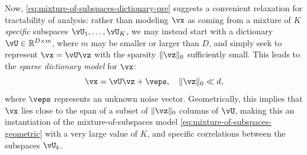 \documentclass[../../book-main.tex]{subfiles}
\begin{document}
Now, \eqref{eq:mixture-of-subspaces-dictionary-pre} suggests a convenient relaxation for tractability of analysis: rather than modeling $\vx$ as coming from a mixture of $K$ \textit{specific} subspaces $\vU_1, \dots, \vU_K$, we may instead start with a dictionary $\vU \in \R^{D \times m}$, where $m$ may be smaller or larger than $D$, and simply seek to represent $\vx = \vU \vz$ with the sparsity $\norm{\vz}_0$ sufficiently small.
This leads to the \textit{sparse dictionary model} for $\vx$:
\begin{equation}\label{eq:mixture-of-subspaces-dictionary}
    \vx =  \vU \vz + \veps,
    \quad
    \norm{\vz}_0 \ll d,
\end{equation}
where $\veps$ represents an unknown noise vector.
Geometrically, this implies that $\vx$ lies close to the span of a subset of $\norm{\vz}_0$ columns of $\vU$,
making this an instantiation of the mixture-of-subspaces model \eqref{eq:mixture-of-subspaces-geometric} with a very large value of $K$, and specific correlations between the subspaces $\vU_k$.

\end{document}
